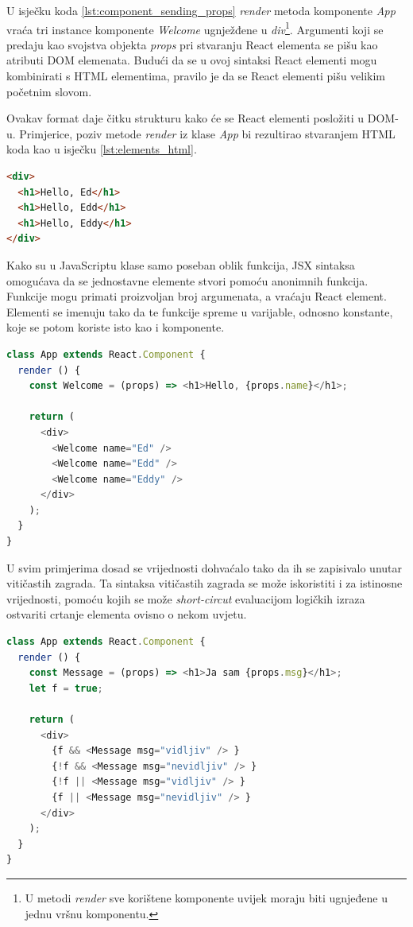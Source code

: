 \documentclass[times, utf8, zavrsni, numeric]{fer}
\newcommand{\razmakp}{\vspace{18pt}}
\newcommand{\razmaks}{\vspace{10pt}}
\begin{document}
\razmakp

U isječku koda \ref{lst:component_sending_props} \emph{render} metoda komponente \emph{App} vraća tri instance komponente \emph{Welcome} ugnježđene u \emph{div}\footnote{U metodi \emph{render} sve korištene komponente uvijek moraju biti ugnjeđene u jednu vršnu komponentu.}.
Argumenti koji se predaju kao svojstva objekta \emph{props} pri stvaranju React elementa se pišu kao atributi DOM elemenata.
Budući da se u ovoj sintaksi React elementi mogu kombinirati s HTML elementima, pravilo je da se React elementi pišu velikim početnim slovom\citep{reactDocsJSX}.

Ovakav format daje čitku strukturu kako će se React elementi posložiti u DOM-u.
Primjerice, poziv metode \emph{render} iz klase \emph{App} bi rezultirao stvaranjem HTML koda kao u isječku \ref{lst:elements_html}.

\razmakp
\begin{lstlisting}[language=html, caption={Elementi isječka koda \ref{lst:component_sending_props} prikazani kao renderirani DOM elementi}, label={lst:elements_html}]
<div>
  <h1>Hello, Ed</h1>
  <h1>Hello, Edd</h1>
  <h1>Hello, Eddy</h1>
</div>
\end{lstlisting}
\razmaks

Kako su u JavaScriptu klase samo poseban oblik funkcija, JSX sintaksa omogućava da se jednostavne elemente stvori pomoću anonimnih funkcija.
Funkcije mogu primati proizvoljan broj argumenata, a vraćaju React element.
Elementi se imenuju tako da te funkcije spreme u varijable, odnosno konstante, koje se potom koriste isto kao i komponente.

\razmakp
\begin{lstlisting}[language=JavaScript, caption={Korištenje anonimne funkcije za stvaranje elementa}]
class App extends React.Component {
  render () {
    const Welcome = (props) => <h1>Hello, {props.name}</h1>;
    
    return (
      <div>
        <Welcome name="Ed" />
        <Welcome name="Edd" />
        <Welcome name="Eddy" />
      </div>
    );
  }
}
\end{lstlisting}
\razmaks

U svim primjerima dosad se vrijednosti dohvaćalo tako da ih se zapisivalo unutar vitičastih zagrada.
Ta sintaksa vitičastih zagrada se može iskoristiti i za istinosne vrijednosti, pomoću kojih se može \emph{short-circut} evaluacijom logičkih izraza ostvariti crtanje elementa ovisno o nekom uvjetu.

\razmakp
\begin{lstlisting}[language=JavaScript, caption={Uvjetno crtanje elementa}]
class App extends React.Component {
  render () {
    const Message = (props) => <h1>Ja sam {props.msg}</h1>;
    let f = true;
    
    return (
      <div>
        {f && <Message msg="vidljiv" /> }
        {!f && <Message msg="nevidljiv" /> }
        {!f || <Message msg="vidljiv" /> }
        {f || <Message msg="nevidljiv" /> }
      </div>
    );
  }
}
\end{lstlisting}
\razmaks
\end{document}
